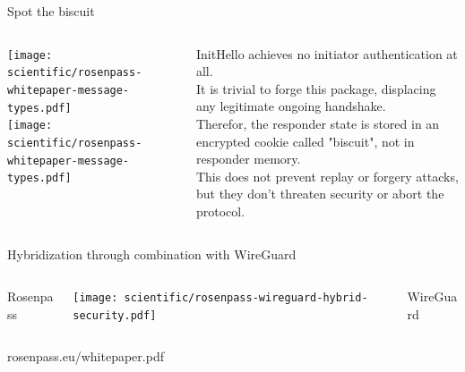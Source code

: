 \begin{frame}{Spot the biscuit}
  \begin{columns}[fullwidth,c]
    \begin{column}{.48\linewidth}
    \centering
    \vspace{.8em}
    \texttt{[image: scientific/rosenpass-whitepaper-message-types.pdf]}
    \\ \texttt{[image: scientific/rosenpass-whitepaper-message-types.pdf]}
    \end{column}

    \begin{column}{.48\linewidth}
        \centering
        InitHello achieves no initiator authentication at all.
        \\[.8em]
        It is trivial to forge this package, displacing any legitimate ongoing handshake.
        \\[.8em]
        Therefor, the responder state is stored in an encrypted cookie called "biscuit", not in responder memory.
        \\[.8em]
        This does not prevent replay or forgery attacks, but they don't threaten security or abort the protocol.

    \end{column}
  \end{columns}
\end{frame}

\begin{frame}{Hybridization through combination with WireGuard}
  \begin{columns}[fullwidth,c]
    \begin{column}{.22\linewidth}
      \flushright
      Rosenpass
    \end{column}
    \begin{column}{.65\linewidth}
      \texttt{[image: scientific/rosenpass-wireguard-hybrid-security.pdf]}
    \end{column}
    \begin{column}{.25\linewidth}
      \flushleft
      WireGuard
    \end{column}
  \end{columns}
\end{frame}

\begin{frame}{}
  \centering

  \raggedright
  \footnotesize
  \hspace{-2.5em} rosenpass.eu/whitepaper.pdf
\end{frame}

